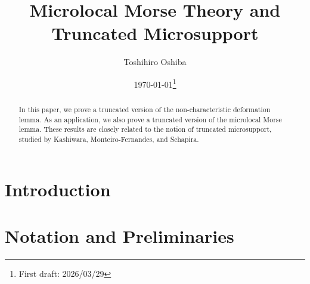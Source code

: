\newcommand{\cotn}[1][]{\dot{T}^{\ast}{#1}}


\newcommand{\muhom}{\mu hom}
\newcommand{\muHom}[1][]{\mathrm{Hom}^\mu_{\raise1.5ex\hbox to.1em{}#1}}

\newcommand{\mucat}[2][]{\mathsf{D}^{\mathrm{b}}_{#1}(#2)}

\newcommand{\conv}[1][]{\mathbin{\mathop{\circ}\limits_{#1}}}


\newcommand{\lopen}{\left]}
\newcommand{\lclosed}{\left[}
\newcommand{\ropen}{\right[}
\newcommand{\rclosed}{\right]}

\newcommand{\sm}{\raisebox{2.33pt}{~\rule{6.4pt}{1.3pt}~}}
\newcommand{\smi}{\smallsetminus}

\newcommand{\smid}{\mathrel{;}}

\newcommand{\Sol}[2][]{\mathop{\mathcal{S}ol}\nolimits_{#1}(#2)}
\newcommand{\Char}{\mathop{\mathrm{Char}}\nolimits}



\title{Microlocal Morse Theory and Truncated Microsupport}
\author{Toshihiro Oshiba}
\date{\today\footnote{First draft: 2026/03/29}}

\maketitle

\begin{abstract}
  In this paper, 
  we prove a truncated version of 
  the non-characteristic deformation lemma.
  As an application, we also prove a truncated version of 
  the microlocal Morse lemma. These results are closely related 
  to the notion of 
  truncated microsupport, 
  studied by Kashiwara, Monteiro-Fernandes, and Schapira. 
\end{abstract}

\tableofcontents

\section{Introduction}\label{sec:intro}
%



\section{Notation and Preliminaries}\label{sec:review}

